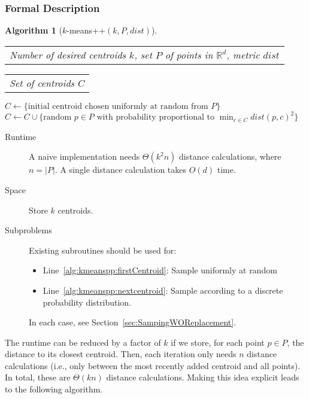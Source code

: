 \documentclass[letterpaper,11pt]{scrreprt}
\numberwithin{equation}{section}
\newcommand{\setsymbol}[1]{\mathbb{#1}}
\newcommand{\R}{\setsymbol{R}}
\theoremstyle{algorithm}
\newtheorem{algorithm}{Algorithm}[section]
\newlength{\alglabelwidth}
\newcommand{\alginput}[1]{%
		\par\noindent%
		\settowidth{\alglabelwidth}{\emph{Output:}}%
		\makebox[\alglabelwidth][l]{\emph{Input:}} \begin{tabular}[t]{l} #1 \end{tabular}}
\newcommand{\algoutput}[1]{%
		\par\noindent%
		\settowidth{\alglabelwidth}{\emph{Output:}}%
		\makebox[\alglabelwidth][l]{\emph{Output:}} \begin{tabular}[t]{l} #1 \end{tabular}}
\newcommand{\set}{\leftarrow}
\newcommand{\dist}{\ensuremath{\mathit{dist}}}
\begin{document}
\subsubsection{Formal Description}

\begin{algorithm}[$k$-means++$(k, P, \dist)$] \label{alg:kmeans++}
\alginput{Number of desired centroids $k$, set $P$ of points in $\R^d$, metric $\dist$}
\algoutput{Set of centroids $C$}
\begin{algorithmic}[1]
	\State $C \set \{ \text{initial centroid chosen uniformly at random from } P \}$ \label{alg:kmeanspp:firstCentroid}
	 \label{alg:kmeans++:for}
		\State $C \set C \cup \{ \text{random $p \in P$ with probability proportional to }\min_{c \in C} \dist(p,c)^2 \}$ \label{alg:kmeanspp:nextcentroid}
	\EndFor
\end{algorithmic}
\end{algorithm}

\begin{description}
	\item[Runtime] A naive implementation needs $\Theta(k^2 n)$ distance calculations, where $n = |P|$. A single distance calculation takes $O(d)$ time.
	\item[Space] Store $k$ centroids.
	\item[Subproblems]
		Existing subroutines should be used for:
		\begin{itemize}
			\item Line~\ref{alg:kmeanspp:firstCentroid}: Sample uniformly at random
			\item Line~\ref{alg:kmeanspp:nextcentroid}: Sample according to a discrete probability distribution.
		\end{itemize}
		In each case, see Section~\ref{sec:SampingWOReplacement}.
\end{description}

The runtime can be reduced by a factor of $k$ if we store, for each point $p \in P$, the distance to its closest centroid. Then, each iteration only needs $n$ distance calculations (i.e., only between the most recently added centroid and all points). In total, these are $\Theta(k n)$ distance calculations. Making this idea explicit leads to the following algorithm.
\end{document}
